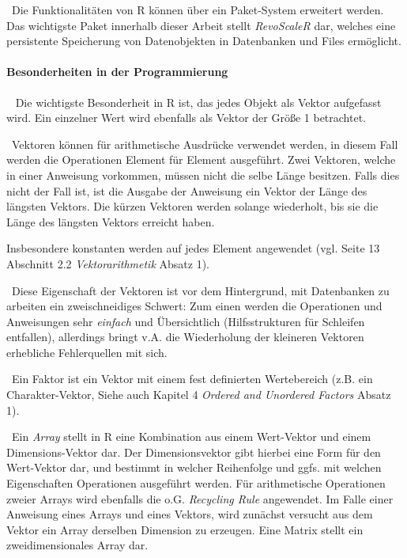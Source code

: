 ~\newline Die Funktionalitäten von R können über ein Paket-System erweitert werden. Das wichtigste Paket innerhalb dieser Arbeit stellt \textit{RevoScaleR} dar, welches eine persistente Speicherung von Datenobjekten in Datenbanken und Files ermöglicht. 

\paragraph{Besonderheiten in der Programmierung}~\newline
Die wichtigste Besonderheit in R ist, das jedes Objekt als Vektor aufgefasst wird. Ein einzelner Wert wird ebenfalls als Vektor der Größe 1 betrachtet.

~\newline Vektoren können für arithmetische Ausdrücke verwendet werden, in diesem Fall werden die Operationen Element für Element ausgeführt. Zwei Vektoren, welche in einer Anweisung vorkommen, müssen nicht die selbe Länge besitzen. Falls dies nicht der Fall ist, ist die Ausgabe der Anweisung ein Vektor der Länge des längsten Vektors. Die kürzen Vektoren werden solange wiederholt, bis sie die Länge des längsten Vektors erreicht haben.

Insbesondere konstanten werden auf jedes Element angewendet (vgl. \cite{RIntro} Seite 13 Abschnitt 2.2 \textit{Vektorarithmetik} Absatz 1).

~\newline Diese Eigenschaft der Vektoren ist vor dem Hintergrund, mit Datenbanken zu arbeiten ein zweischneidiges Schwert: Zum einen werden die Operationen und Anweisungen sehr \textit{einfach} und Übersichtlich (Hilfsstrukturen für Schleifen entfallen), allerdings bringt v.A. die Wiederholung der kleineren Vektoren erhebliche Fehlerquellen mit sich. 

~\newline Ein Faktor ist ein Vektor mit einem fest definierten Wertebereich (z.B. ein Charakter-Vektor, Siehe auch \cite{RIntro} Kapitel 4 \textit{Ordered and Unordered Factors} Absatz 1).

~\newline Ein \textit{Array} stellt in R eine Kombination aus einem Wert-Vektor und einem Dimensions-Vektor dar. Der Dimensionsvektor gibt hierbei eine Form für den Wert-Vektor dar, und bestimmt in welcher Reihenfolge und ggfs. mit welchen Eigenschaften Operationen ausgeführt werden. Für arithmetische Operationen zweier Arrays wird ebenfalls die o.G. \textit{Recycling Rule} angewendet. Im Falle einer Anweisung eines Arrays und eines Vektors, wird zunächst versucht aus dem Vektor ein Array derselben Dimension zu erzeugen. Eine Matrix stellt ein zweidimensionales Array dar. 

